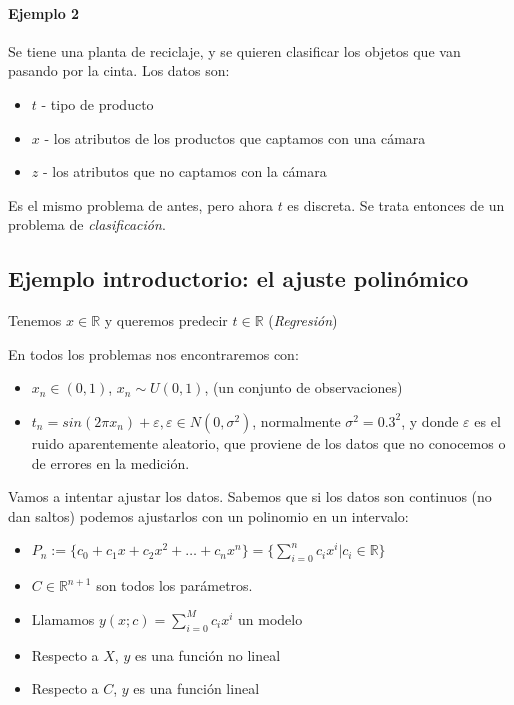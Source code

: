 \documentclass[a4paper,10pt]{article}
\begin{document}
\paragraph{Ejemplo 2}
Se tiene una planta de reciclaje, y se quieren clasificar los objetos que van pasando por la cinta. Los datos son:
\begin{itemize}
\item $t$ - tipo de producto
\item $x$ - los atributos de los productos que captamos con una cámara
\item $z$ - los atributos que no captamos con la cámara
\end{itemize}

Es el mismo problema de antes, pero ahora $t$ es discreta. Se trata entonces de un problema de \textit{clasificación}.

\subsection{Ejemplo introductorio: el ajuste polinómico}

Tenemos $x \in \mathbb{R}$ y queremos predecir $t \in \mathbb{R}$ (\textit{Regresión})

En todos los problemas nos encontraremos con:
\begin{itemize}
\item $x_n \in (0,1)$, $x_n \sim U(0,1) $, (un conjunto de observaciones)
\item $t_n = sin(2\pi x_n) + \varepsilon, \varepsilon \in N(0,\sigma^2)$, normalmente $\sigma^2 = 0.3^2$, y donde $\varepsilon$ es el ruido aparentemente aleatorio, que proviene de los datos que no conocemos o de errores en la medición.
\end{itemize}

Vamos a intentar ajustar los datos. Sabemos que si los datos son continuos (no dan saltos) podemos ajustarlos con un polinomio en un intervalo:
\begin{itemize}
\item $P_n := \{c_0 + c_1x + c_2x^2 + \dots + c_nx^n\} = \{\sum_{i = 0}^n c_ix^i | c_i \in \mathbb{R} \}$
\item $C \in \mathbb{R}^{n + 1}$ son todos los parámetros.
\item Llamamos $y(x;c) = \sum_{i = 0}^{M} c_ix^i$ un modelo
\item Respecto a $X$, $y$ es una función no lineal
\item Respecto a $C$, $y$ es una función lineal
\end{itemize}
\end{document}

